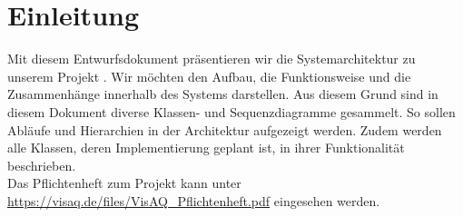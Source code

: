 \section{Einleitung}
Mit diesem Entwurfsdokument präsentieren wir die Systemarchitektur zu unserem Projekt \softwarename.
Wir möchten den Aufbau, die Funktionsweise und die Zusammenhänge innerhalb des Systems darstellen.
Aus diesem Grund sind in diesem Dokument diverse Klassen- und Sequenzdiagramme gesammelt.
So sollen Abläufe und Hierarchien in der Architektur aufgezeigt werden.
Zudem werden alle Klassen, deren Implementierung geplant ist, in ihrer Funktionalität beschrieben.
\\
Das Pflichtenheft zum Projekt \softwarename kann unter \url{https://visaq.de/files/VisAQ_Pflichtenheft.pdf} eingesehen werden.
